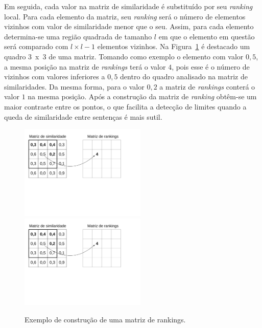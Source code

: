 
Em seguida, cada valor na matriz de similaridade é substituído por seu \textit{ranking} local. Para cada elemento da matriz, seu \textit{ranking} será o número de elementos vizinhos com valor de similaridade menor que o seu. Assim, para cada elemento determina-se uma região quadrada de tamanho $l$ em que o elemento em questão será comparado com $l \times l - 1$ elementos vizinhos.
% 
% 
Na Figura~\ref{fig:exemplomatrixrank} é destacado um quadro 3~x~3 de uma matriz. Tomando como exemplo o elemento com valor $0,5$, a mesma posição na matriz de \textit{rankings} terá o valor $4$, pois esse é o número de vizinhos com valores inferiores a $0,5$ dentro do quadro analisado na matriz de similaridades. Da mesma forma, 
para o valor $0,2$ a matriz de \textit{rankings} conterá o valor $1$ na mesma posição. Após a construção da matriz de \textit{ranking} obtêm-se um maior contraste entre os pontos, o que facilita a detecção de limites quando a queda de similaridade entre sentenças é mais sutil.

\begin{figure}[!h]
	\centering     %

		\includegraphics[trim={ 10 250 80 40 },clip,page=1,width=60mm]{conteudo/capitulos/figs/c99-matrizes.pdf}
		\includegraphics[trim={ 10 250 80 40 },clip,page=2,width=60mm]{conteudo/capitulos/figs/c99-matrizes.pdf}
	\caption{Exemplo de construção de uma matriz de rankings.%
	}
	\label{fig:exemplomatrixrank}
\end{figure}


